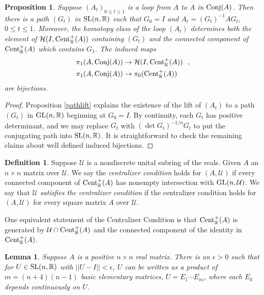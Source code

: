 \documentclass{amsart}
\newtheorem{lemma}[theorem]{Lemma}
\newtheorem{prop}[theorem]{Proposition}
\theoremstyle{definition}
\newtheorem{definition}[theorem]{Definition}
\theoremstyle{remark}
\numberwithin{equation}{section}
\begin{document}
{{\begin{prop} 
Suppose $(A_t)_{0\leq t \leq 1}$ is a 
loop from $A$ to $A$ in $\textnormal{Conj}(A)$. 
Then there is a path $(G_t)$ in $\textnormal{SL}(n, \mathbb R)$ 
such that $G_0=I$ and  
$A_t=(G_t)^{-1}AG_t$, $0\leq t \leq 1$.  Moreover, the homotopy class of the 
loop $(A_t)$  determines both the element of 
$\mathcal H(I, {\textnormal{Cent}^+_{\mathbb R}(A)})$ containing $(G_t)$ and the connected component of 
${\textnormal{Cent}^+_{\mathbb R}(A)}$ which contains $G_1$. The induced maps 
\begin{align*} 
\pi_1(A,\textnormal{Conj}(A)) &\to 
\mathcal H(I, {\textnormal{Cent}^+_{\mathbb R}(A)})\ \ ,  \\ 
\pi_1(A,\textnormal{Conj}(A)) &\to 
\pi_0({\textnormal{Cent}^+_{\mathbb R}(A)})
\end{align*}  
are bijections. 
\end{prop}
\begin{proof}
Proposition \ref{pathlift} 
explains the existence of the lift 
of $(A_t)$ to a path 
$(G_t)$ in $\textnormal{GL}(n,\mathbb R)$ beginning at $G_0=I$. 
By continuity, each $G_t$ has positive determinant,  
and we may replace $G_t$ with $(\det G_t)^{-1/n} G_t$ to put 
the conjugating path into $\textnormal{SL}(n,\mathbb R)$. It is straightforward 
to check the remaining claims about well defined induced bijections. 
\end{proof} 

\begin{definition} \label{centralizercondition} 
Suppose $\mathcal U$ is a nondiscrete unital subring of the reals. 
Given $A$  an $n\times n$ matrix over $\mathcal U$. We say 
the {\it  centralizer condition} holds for $(A, \mathcal U)$ if
every connected component of ${\textnormal{Cent}^+_{\mathbb R}(A)} $ 
has nonempty intersection with 
$\textnormal{GL}(n,\mathcal U)$.  We say that 
{\it 
$\mathcal U$ 
satisfies the 
centralizer condition} if the centralizer condition holds for 
$(A, \mathcal U)$ for every 
square matrix $A$ over $\mathcal U$. 
\end{definition} 
One equivalent statement of the 
 Centralizer Condition is that 
${\textnormal{Cent}^+_{\mathbb R}(A)} $ is generated by 
$\mathcal U \cap {\textnormal{Cent}^+_{\mathbb R}(A)}  $ 
 and the connected component of the identity in 
${\textnormal{Cent}^+_{\mathbb R}(A)} $. 
 
\begin{lemma} \label{factorize} 
Suppose $A$ is a positive $n\times n$ real matrix. 
There is an $\epsilon >0$ 
such that for $U\in \textnormal{SL}(n,\mathbb R)$ with $||U-I||< \epsilon $, 
$U$ can be written as a product of $m=(n+4)(n-1)$ basic elementary matrices,  
$U=E_1 \cdots E_{m}$, where each $E_k$ depends continuously on $U$. 


\end{lemma}}}
\end{document}
